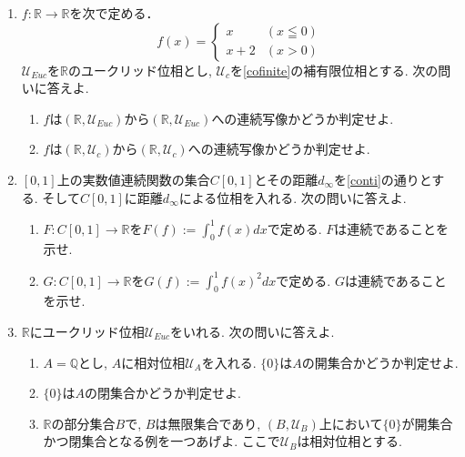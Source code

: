 \documentclass[dvipdfmx,a4paper,11pt]{article}
\newcommand{\R}{\mathbb{R}}
\newcommand{\Q}{\mathbb{Q}}
\theoremstyle{definition}
\begin{document}
\begin{enumerate}[ label=\textbf{問}\ref*{sec-conti}.\arabic*]
\item $f : \R \rightarrow \R$を次で定める．
   $$
  f(x)= \begin{cases}
     x& (x \leqq 0) \\
    x+2& (x >0)
  \end{cases}
  $$
  $\mathscr{U}_{Euc}$を$\R$のユークリッド位相とし, $\mathscr{U}_c$を\ref{cofinite}の補有限位相とする. 次の問いに答えよ.
 	\begin{enumerate}
	\setlength{\parskip}{0cm} 
  \setlength{\itemsep}{0cm} 
	\item $f $は$(\R, \mathscr{U}_{Euc})$から$(\R, \mathscr{U}_{Euc})$への連続写像かどうか判定せよ.
	\item $f $は$(\R, \mathscr{U}_c)$から$(\R, \mathscr{U}_c)$への連続写像かどうか判定せよ.
	\end{enumerate}
\item $[0,1]$上の実数値連続関数の集合$C[0,1]$とその距離$d_{\infty}$を\ref{conti}の通りとする. そして$C[0,1]$に距離$d_{\infty}$による位相を入れる. 次の問いに答えよ.
	\begin{enumerate}
	\setlength{\parskip}{0cm} 
  \setlength{\itemsep}{0cm} 
	\item $F : C[0,1] \rightarrow \R$を$F(f) := \int_{0}^{1} f(x) dx$で定める. $F$は連続であることを示せ.
	\item $G : C[0,1]\rightarrow \R$を$G(f) := \int_{0}^{1} f(x)^2 dx$で定める. $G$は連続であることを示せ.
	\end{enumerate}

\newpage
\item $\R$にユークリッド位相$\mathscr{U}_{Euc}$をいれる. 次の問いに答えよ.
	\begin{enumerate}
	\setlength{\parskip}{0cm} 
  \setlength{\itemsep}{0cm} 
	\item $A=\Q$とし, $A$に相対位相$\mathscr{U}_{A}$を入れる. $\{ 0\}$は$A$の開集合かどうか判定せよ. 
	\item $\{ 0\}$は$A$の閉集合かどうか判定せよ.
	\item $\R$の部分集合$B$で, $B$は無限集合であり, $(B, \mathscr{U}_{B})$上において$\{ 0\}$が開集合かつ閉集合となる例を一つあげよ. ここで$\mathscr{U}_{B}$は相対位相とする.
	\end{enumerate}


\end{enumerate}
\end{document}
